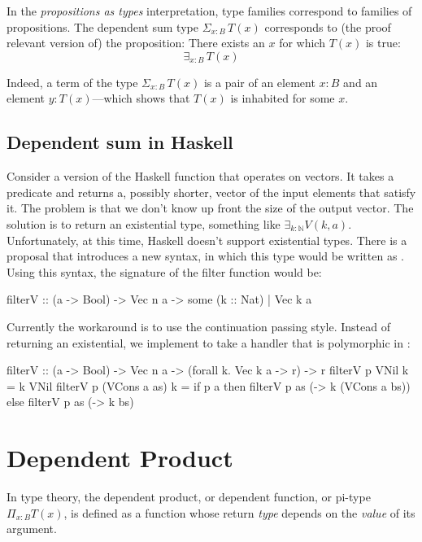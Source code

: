 \documentclass[DaoFP]{subfiles}
\begin{document}
In the \emph{propositions as types} interpretation, type families correspond to families of propositions. The dependent sum type $\Sigma_{x : B} \, T(x)$ corresponds to (the proof relevant version of) the proposition: There exists an $x$ for which $T(x)$ is true:
\[ \exists_{x : B} \, T (x)\]

Indeed, a term of the type $\Sigma_{x : B} \, T(x)$ is a pair of an element $x \colon B$ and an element $y \colon T(x)$---which shows that $T(x)$ is inhabited for some $x$.

\subsection{Dependent sum in Haskell}

Consider a version of the Haskell  function that operates on vectors. It takes a predicate  and returns a, possibly shorter, vector of the input elements that satisfy it. The problem is that we don't know up front the size of the output vector. The solution is to return an existential type, something like $\exists_{k : \mathbb N} V(k, a)$. Unfortunately, at this time, Haskell doesn't support existential types. There is a proposal that introduces a new syntax, in which this type would be written as . Using this syntax, the signature of the filter function would be:
\begin{haskell}
filterV :: (a -> Bool) -> Vec n a -> some (k :: Nat) | Vec k a
\end{haskell}

Currently the workaround is to use the continuation passing style. Instead of returning an existential, we implement  to take a handler that is polymorphic in :
\begin{haskell}
filterV :: (a -> Bool) -> Vec n a -> (forall k. Vec k a -> r) -> r 
filterV p VNil k = k VNil
filterV p (VCons a as) k = 
  if p a 
     then filterV p as (\bs -> k (VCons a bs))
     else filterV p as (\bs -> k bs)
\end{haskell}


\section{Dependent Product}

In type theory, the dependent product, or dependent function, or pi-type $\Pi_{x:B} T(x)$, is defined as a function whose return \emph{type} depends on the \emph{value} of its argument. 
\end{document}
